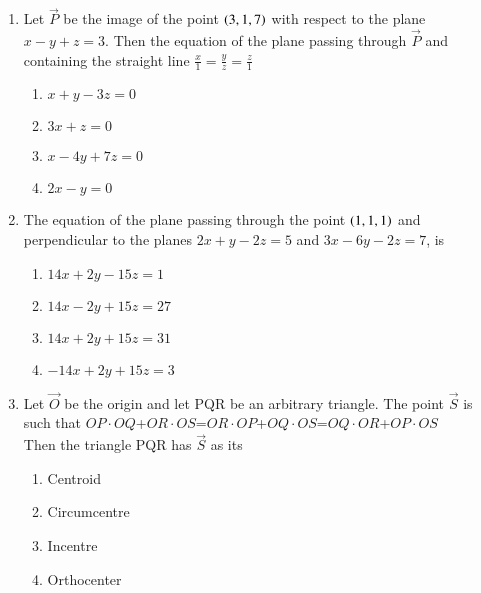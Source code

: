 \documentclass[journal,12pt,twocolumn]{IEEEtran}
\theoremstyle{remark}
\begin{document}
\begin{enumerate}
         \item %
		 Let $\vec{P}$ be the image of the point $\left(3,1,7\right)$ with respect to the plane $x-y+z=3$. Then the equation of the plane passing through $\vec{P}$ and containing the straight line $\frac{x}{1}=\frac{y}{z}=\frac{z}{1}$ \hfill{}\\
\begin{enumerate}
        \item $x+y-3z=0$                             
        \item $3x+z=0$                           
        \item $x-4y+7z=0$            
        \item $2x-y=0$\\          
\end{enumerate}

         \item %
		 The equation of the plane passing through the point $\left(1,1,1\right)$ and perpendicular to the planes $2x+y-2z=5$ and $3x-6y-2z=7$, is \hfill{}\\
\begin{enumerate}
        \item $14x+2y-15z=1$                             
        \item $14x-2y+15z=27$                           
        \item $14x+2y+15z=31$            
        \item $-14x+2y+15z=3$\\          
\end{enumerate}

         \item %
		 Let $\vec{O}$ be the origin and let PQR be an arbitrary triangle. The point $\vec{S}$ is such that $OP\cdot OQ$+$OR\cdot OS$=$OR\cdot OP$+$OQ\cdot OS$=$OQ\cdot OR$+$OP\cdot OS$\\
Then the triangle PQR has $\vec{S}$ as its \hfill{}\\
\begin{enumerate}
        \item Centroid                             
        \item Circumcentre                           
        \item Incentre            
        \item Orthocenter\\          
\end{enumerate}
\end{enumerate}
\end{document}
